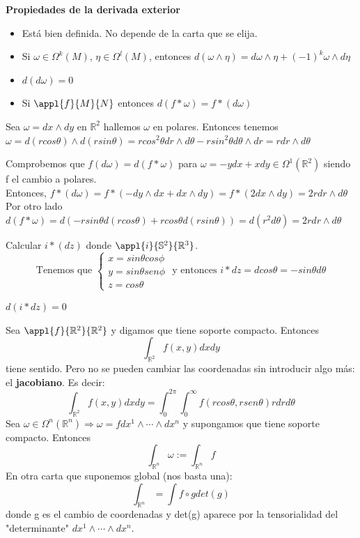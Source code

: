 \documentclass[palatino, bibnumbers]{apuntes}
\begin{document}
\textbf{Propiedades de la derivada exterior}
\begin{itemize}
	\item Está bien definida. No depende de la carta que se elija.
	\item Si $\omega\in\Omega^k(M)$, $\eta\in\Omega^l(M)$, entonces $d(\omega\wedge\eta)=d\omega\wedge\eta+(-1)^k\omega\wedge d\eta$
	\item $d(d\omega)=0$
	\item Si $\appl{f}{M}{N}$ entonces $d(f\ast\omega)=f\ast(d\omega)$
\end{itemize}

\begin{example}Sea $\omega=dx\wedge dy$ en $\mathbb{R}^2$ hallemos $\omega$ en polares. Entonces tenemos $\omega=d(rcos\theta)\wedge d(rsin\theta)=rcos^2\theta dr\wedge d\theta-rsin^2\theta d\theta\wedge dr=rdr\wedge d\theta$
\end{example}

\begin{example}Comprobemos que $f(d\omega)=d(f\ast\omega)$ para $\omega=-ydx+xdy\in\Omega^1(\mathbb{R}^2)$ siendo f el cambio a polares.\\ Entonces, $f\ast(d\omega)=f\ast(-dy\wedge dx+dx\wedge dy)=f\ast(2dx\wedge dy)=2rdr\wedge d\theta$\\ Por otro lado $d(f\ast\omega)=d(-rsin\theta d(rcos\theta)+rcos\theta d(rsin\theta))=d(r^2d\theta)=2rdr\wedge d\theta$
\end{example}

\begin{example}Calcular $i\ast(dz)$ donde $\appl{i}{\mathbb{S}^2}{\mathbb{R}^3}$.$$\text{Tenemos que }\begin{cases}
	x=sin\theta cos\phi\\
	y=sin\theta sen\phi\\
	z=cos\theta
	\end{cases}\text{ y entonces }i\ast dz=dcos\theta=-sin\theta d\theta$$
\end{example}

\begin{obs}$d(i\ast dz)=0$
\end{obs}

Sea $\appl{f}{\mathbb{R}^2}{\mathbb{R}^2}$ y digamos que tiene soporte compacto. Entonces $$\int_{\mathbb{R}^2}f(x,y)dxdy$$ tiene sentido. Pero no se pueden cambiar las coordenadas sin introducir algo más: el \textbf{jacobiano}. Es decir: $$\int_{\mathbb{R}^2}f(x,y)dxdy=\int_{0}^{2\pi}\int_{0}^{\infty}f(rcos\theta,rsen\theta)rdrd\theta$$
 Sea $\omega\in\Omega^n(\mathbb{R}^n)\Rightarrow\omega=fdx^1\wedge\cdots\wedge dx^n$ y supongamos que tiene soporte compacto. Entonces $$\int_{\mathbb{R}^n}\omega:=\int_{\mathbb{R}^n}f$$ En otra carta que suponemos global (nos basta una): $$\int_{\mathbb{R}^n}=\int f\circ gdet(g)$$ donde g es el cambio de coordenadas y det(g) aparece por la tensorialidad del "determinante" $dx^1\wedge\cdots\wedge dx^n$.\\
 
\end{document}
